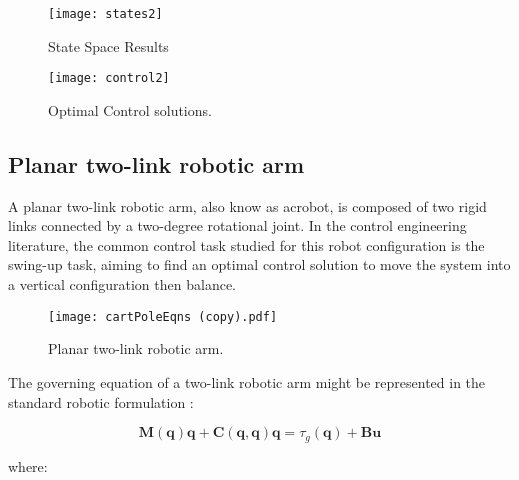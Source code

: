\documentclass[]{hdsr}
\begin{document}
\begin{figure}[H]
\centering
\texttt{[image: states2]}
\caption{State Space Results}
\label{fig:car_poleopt2}
\end{figure}

\begin{figure}[H]
\centering
\texttt{[image: control2]}
\caption{Optimal Control solutions.}
\label{fig:car_poleopt3}
\end{figure}

\subsection{Planar two-link robotic arm} 

A planar two-link robotic arm, also know as acrobot, is composed of two rigid links connected by a two-degree rotational joint. In the control engineering literature, the common control task studied for this robot configuration is the swing-up task, aiming to find an optimal control solution to move the system into a vertical configuration then balance.

\begin{figure}[H]
    \centering
    \texttt{[image: cartPoleEqns (copy).pdf]} \\
    \caption{Planar two-link robotic arm.}
    \label{fig:car_pole}
\end{figure}

The governing equation of a two-link robotic arm might be represented in the standard robotic formulation \cite{tedrake2016underactuated}:

\begin{equation}
\mathbf{M}(\mathbf{q}) \mathbf{q}+\mathbf{C}(\mathbf{q}, \mathbf{q}) \mathbf{q}=\tau_{g}(\mathbf{q})+\mathbf{B} \mathbf{u}
\end{equation}

where: 
\end{document}
